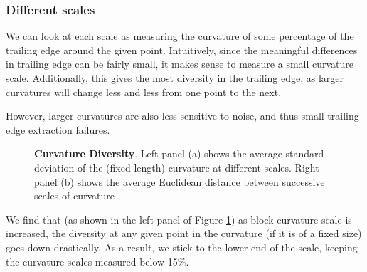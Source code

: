\subsubsection{Different scales}

We can look at each scale as measuring the curvature of some percentage of the trailing edge around the given point.
Intuitively, since the meaningful differences in trailing edge can be fairly small, it makes sense to measure a small curvature scale.
Additionally, this gives the most diversity in the trailing edge, as larger curvatures will change less and less from one point to the next.

However, larger curvatures are also less sensitive to noise, and thus small trailing edge extraction failures.


\begin{figure}[t]%
	\centering
	\caption[]{\textbf{Curvature Diversity}. Left panel (a) shows the average standard deviation of the (fixed length) curvature at different scales. Right panel (b) shows the average Euclidean distance between successive scales of curvature}
    	\label{fig:curvature_diversity}
\end{figure}


We find that (as shown in the left panel of Figure \ref{fig:curvature_diversity}) as block curvature scale is increased, the diversity at any given point in the curvature (if it is of a fixed size) goes down drastically. 
As a result, we stick to the lower end of the scale, keeping the curvature scales measured below 15\%.


